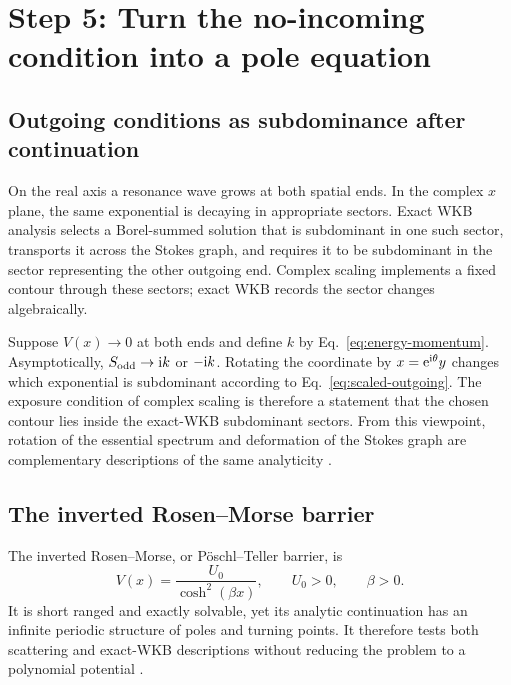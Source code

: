 \section{Step 5: Turn the no-incoming condition into a pole equation}
\label{sec:wkb-resonance}

\subsection{Outgoing conditions as subdominance after continuation}
\label{subsec:wkb-outgoing}

On the real axis a resonance wave grows at both spatial ends.  In the complex
$x$ plane, the same exponential is decaying in appropriate sectors.  Exact
WKB analysis selects a Borel-summed solution that is subdominant in one such
sector, transports it across the Stokes graph, and requires it to be
subdominant in the sector representing the other outgoing end.  Complex
scaling implements a fixed contour through these sectors; exact WKB records
the sector changes algebraically.

Suppose $V(x)\to0$ at both ends and define $k$ by
Eq.~\eqref{eq:energy-momentum}.  Asymptotically,
$S_{\mathrm{odd}}\to\mathrm{i} k$ or $-\mathrm{i} k$.  Rotating the coordinate by
$x=\mathrm{e}^{\mathrm{i}\theta}y$ changes which exponential is subdominant according to
Eq.~\eqref{eq:scaled-outgoing}.  The exposure condition of complex scaling is
therefore a statement that the chosen contour lies inside the exact-WKB
subdominant sectors.  From this viewpoint, rotation of the essential spectrum
and deformation of the Stokes graph are complementary descriptions of the
same analyticity
\cite{Morikawa:2025xjq,Morikawa:2025vvs}.

\subsection{The inverted Rosen--Morse barrier}
\label{subsec:rosen-morse}

The inverted Rosen--Morse, or P\"oschl--Teller barrier, is
\begin{equation}
  V(x)=\frac{U_0}{\cosh^2(\beta x)},
  \qquad U_0>0,
  \qquad \beta>0 .
  \label{eq:rosen-morse-potential}
\end{equation}
It is short ranged and exactly solvable, yet its analytic continuation has an
infinite periodic structure of poles and turning points.  It therefore tests
both scattering and exact-WKB descriptions without reducing the problem to a
polynomial potential
\cite{PhysRev.42.210,Zhao:1995,Landau:1991wop,Ryaboy:1993}.

